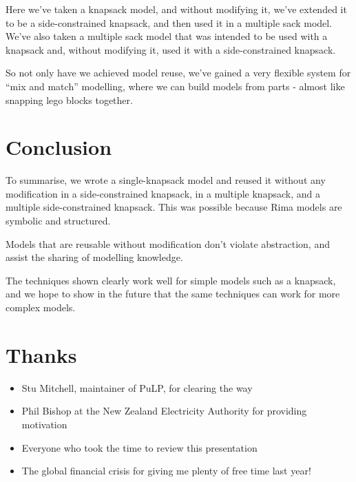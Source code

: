 \documentclass[a4paper,12pt]{article}
\begin{document}
Here we've taken a knapsack model, and without modifying it,
we've extended it to be a side-constrained knapsack,
and then used it in a multiple sack model.
We've also taken a multiple sack model that was intended to be used with
a knapsack and, without modifying it,
used it with a side-constrained knapsack.

So not only have we achieved model reuse,
we've gained a very flexible system for ``mix and match'' modelling,
where we can build models from parts -
almost like snapping lego blocks together.


\section{Conclusion}

To summarise,
we wrote a single-knapsack model and reused it without any modification in
a side-constrained knapsack, in a multiple knapsack, and a multiple side-constrained knapsack.
This was possible because Rima models are symbolic and structured.

Models that are reusable without modification don't violate abstraction,
and assist the sharing of modelling knowledge.

The techniques shown clearly work well for simple models such as a knapsack,
and we hope to show in the future that the same techniques can work for more complex models.


\section{Thanks}
  \begin{itemize}
    \item Stu Mitchell, maintainer of PuLP, for clearing the way
    \item Phil Bishop at the New Zealand Electricity Authority for providing motivation
    \item Everyone who took the time to review this presentation
    \item The global financial crisis for giving me plenty of free time last year!
  \end{itemize}

\end{document}
